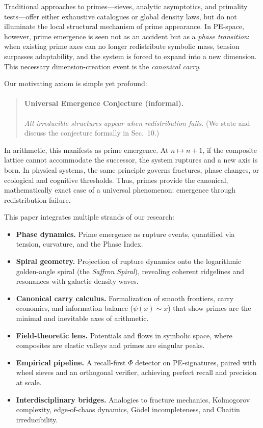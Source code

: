 \documentclass[11pt]{article}
\theoremstyle{plain}
\theoremstyle{definition}
\begin{document}
Traditional approaches to primes—sieves, analytic asymptotics, and primality tests—offer either exhaustive catalogues or global density laws, but do not illuminate the local structural mechanism of prime appearance. In PE-space, however, prime emergence is seen not as an accident but as a \emph{phase transition}: when existing prime axes can no longer redistribute symbolic mass, tension surpasses adaptability, and the system is forced to expand into a new dimension. This necessary dimension-creation event is the \emph{canonical carry}.

Our motivating axiom is simple yet profound:

\begin{quote}
\paragraph{Universal Emergence Conjecture (informal).}
\emph{All irreducible structures appear when redistribution fails.}
(We state and discuss the conjecture formally in Sec.~10.)
\end{quote}

In arithmetic, this manifests as prime emergence. At $n \mapsto n+1$, if the composite lattice cannot accommodate the successor, the system ruptures and a new axis is born. In physical systems, the same principle governs fractures, phase changes, or ecological and cognitive thresholds. Thus, primes provide the canonical, mathematically exact case of a universal phenomenon: emergence through redistribution failure.

This paper integrates multiple strands of our research:
\begin{itemize}
  \item \textbf{Phase dynamics.} Prime emergence as rupture events, quantified via tension, curvature, and the Phase Index.
  \item \textbf{Spiral geometry.} Projection of rupture dynamics onto the logarithmic golden-angle spiral (the \emph{Saffron Spiral}), revealing coherent ridgelines and resonances with galactic density waves.
  \item \textbf{Canonical carry calculus.} Formalization of smooth frontiers, carry economics, and information balance ($\psi(x) \sim x$) that show primes are the minimal and inevitable axes of arithmetic.
  \item \textbf{Field-theoretic lens.} Potentials and flows in symbolic space, where composites are elastic valleys and primes are singular peaks.
  \item \textbf{Empirical pipeline.} A recall-first $\Phi$ detector on PE-signatures, paired with wheel sieves and an orthogonal verifier, achieving perfect recall and precision at scale.
  \item \textbf{Interdisciplinary bridges.} Analogies to fracture mechanics, Kolmogorov complexity, edge-of-chaos dynamics, Gödel incompleteness, and Chaitin irreducibility.
\end{itemize}
\end{document}
